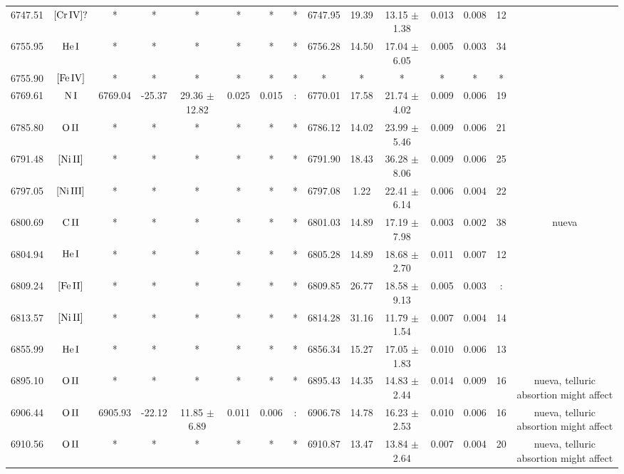 \documentclass{article}
\begin{document}
\begin{table*}
\begin{adjustbox}{width=\textwidth}
\begin{tabular}{ccccccccccccccc}
6747.51 & $\mbox{[Cr}\thinspace \mbox{IV]?}$ & * & * & * & * & * & * & 6747.95 & 19.39 & 13.15 $\pm$ 1.38 & 0.013 & 0.008 & 12 &  \\
6755.95 & $\mbox{He}\thinspace \mbox{I}$ & * & * & * & * & * & * & 6756.28 & 14.50 & 17.04 $\pm$ 6.05 & 0.005 & 0.003 & 34 &  \\
6755.90 & $\mbox{[Fe}\thinspace \mbox{IV]}$ & * & * & * & * & * & * & * & * & * & * & * & * &  \\
6769.61 & $\mbox{N}\thinspace \mbox{I}$ & 6769.04 & -25.37 & 29.36 $\pm$ 12.82 & 0.025 & 0.015 & : & 6770.01 & 17.58 & 21.74 $\pm$ 4.02 & 0.009 & 0.006 & 19 &  \\
6785.80 & $\mbox{O}\thinspace \mbox{II}$ & * & * & * & * & * & * & 6786.12 & 14.02 & 23.99 $\pm$ 5.46 & 0.009 & 0.006 & 21 &  \\
6791.48 & $\mbox{[Ni}\thinspace \mbox{II]}$ & * & * & * & * & * & * & 6791.90 & 18.43 & 36.28 $\pm$ 8.06 & 0.009 & 0.006 & 25 &  \\
6797.05 & $\mbox{[Ni}\thinspace \mbox{III]}$ & * & * & * & * & * & * & 6797.08 & 1.22 & 22.41 $\pm$ 6.14 & 0.006 & 0.004 & 22 &  \\
6800.69 & $\mbox{C}\thinspace \mbox{II}$ & * & * & * & * & * & * & 6801.03 & 14.89 & 17.19 $\pm$ 7.98 & 0.003 & 0.002 & 38 &  nueva \\
6804.94 & $\mbox{He}\thinspace \mbox{I}$ & * & * & * & * & * & * & 6805.28 & 14.89 & 18.68 $\pm$ 2.70 & 0.011 & 0.007 & 12 &  \\
6809.24 & $\mbox{[Fe}\thinspace \mbox{II]}$ & * & * & * & * & * & * & 6809.85 & 26.77 & 18.58 $\pm$ 9.13 & 0.005 & 0.003 & : &  \\
6813.57 & $\mbox{[Ni}\thinspace \mbox{II]}$ & * & * & * & * & * & * & 6814.28 & 31.16 & 11.79 $\pm$ 1.54 & 0.007 & 0.004 & 14 &  \\
6855.99 & $\mbox{He}\thinspace \mbox{I}$ & * & * & * & * & * & * & 6856.34 & 15.27 & 17.05 $\pm$ 1.83 & 0.010 & 0.006 & 13 &  \\
6895.10 & $\mbox{O}\thinspace \mbox{II}$ & * & * & * & * & * & * & 6895.43 & 14.35 & 14.83 $\pm$ 2.44 & 0.014 & 0.009 & 16 &  nueva, telluric absortion might affect \\
6906.44 & $\mbox{O}\thinspace \mbox{II}$ & 6905.93 & -22.12 & 11.85 $\pm$ 6.89 & 0.011 & 0.006 & : & 6906.78 & 14.78 & 16.23 $\pm$ 2.53 & 0.010 & 0.006 & 16 &  nueva, telluric absortion might affect \\
6910.56 & $\mbox{O}\thinspace \mbox{II}$ & * & * & * & * & * & * & 6910.87 & 13.47 & 13.84 $\pm$ 2.64 & 0.007 & 0.004 & 20 &  nueva, telluric absortion might affect \\

\end{tabular}
\end{adjustbox}
\end{table*}
\end{document}
